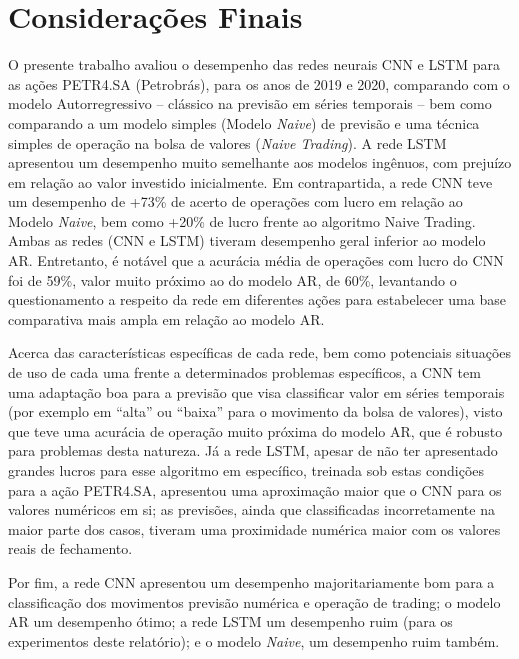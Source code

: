 \chapter{Considerações Finais}

\par
O presente trabalho avaliou o desempenho das redes neurais CNN e LSTM para as ações PETR4.SA (Petrobrás), para os anos de 2019 e 2020, comparando com o modelo Autorregressivo – clássico na previsão em séries temporais – bem como comparando a um modelo simples (Modelo \textit{Naive}) de previsão e uma técnica simples de operação na bolsa de valores (\textit{Naive Trading}). A rede LSTM apresentou um desempenho muito semelhante aos modelos ingênuos, com prejuízo em relação ao valor investido inicialmente. Em contrapartida, a rede CNN teve um desempenho de +73\% de acerto de operações com lucro em relação ao Modelo \textit{Naive}, bem como +20\% de lucro frente ao algoritmo Naive Trading. Ambas as redes (CNN e LSTM) tiveram desempenho geral inferior ao modelo AR. Entretanto, é notável que a acurácia média de operações com lucro do CNN foi de 59\%, valor muito próximo ao do modelo AR, de 60\%, levantando o questionamento a respeito da rede em diferentes ações para estabelecer uma base comparativa mais ampla em relação ao modelo AR.

\par
Acerca das características específicas de cada rede, bem como potenciais situações de uso de cada uma frente a determinados problemas específicos, a CNN tem uma adaptação boa para a previsão que visa classificar valor em séries temporais (por exemplo em “alta” ou “baixa” para o movimento da bolsa de valores), visto que teve uma acurácia de operação muito próxima do modelo AR, que é robusto para problemas desta natureza. Já a rede LSTM, apesar de não ter apresentado grandes lucros para esse algoritmo em específico, treinada sob estas condições para a ação PETR4.SA, apresentou uma aproximação maior que o CNN para os valores numéricos em si; as previsões, ainda que classificadas incorretamente na maior parte dos casos, tiveram uma proximidade numérica maior com os valores reais de fechamento.

\par
Por fim, a rede CNN apresentou um desempenho majoritariamente bom para a classificação dos movimentos previsão numérica e operação de trading; o modelo AR um desempenho ótimo; a rede LSTM um desempenho ruim (para os experimentos deste relatório); e o modelo \textit{Naive}, um desempenho ruim também.